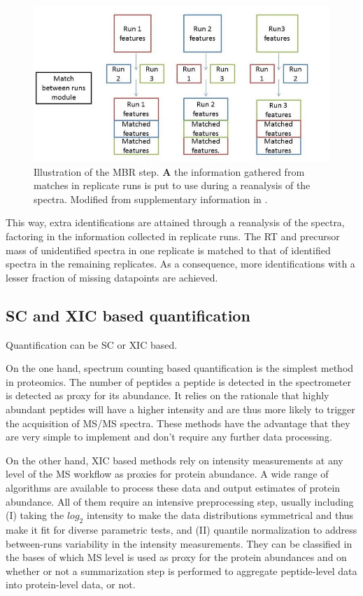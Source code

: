 \documentclass[11pt, a4paper]{report}
\begin{document}
\begin{figure}[!h]
\centering
\includegraphics[width=0.9\linewidth]{mbr_workflow}
\caption{Illustration of the \ac{MBR} step. \textbf{A} the information gathered from matches in replicate runs is put to use during a reanalysis of the spectra. Modified from supplementary information in \cite{Argentini2016}.}
\label{figure:moff_mbr}
\end{figure}

This way, extra identifications are attained through a reanalysis of the spectra, factoring in the information collected in replicate runs. The RT and precursor mass of unidentified spectra in one replicate is matched to that of identified spectra in the remaining replicates. As a consequence, more identifications with a lesser fraction of missing datapoints are achieved.


\subsection{SC and XIC based quantification}
\label{subsec:scvsxic}


Quantification can be \ac{SC} or \ac{XIC} based.

On the one hand, spectrum counting based quantification is the simplest method in proteomics. The number of peptides a peptide is detected in the spectrometer is detected as proxy for its abundance. It relies on the rationale that highly abundant peptides will have a higher intensity and are thus more likely to trigger the acquisition of MS/MS spectra. These methods have the advantage that they are very simple to implement and don't require any further data processing.

On the other hand, \ac{XIC} based methods rely on intensity measurements at any level of the \ac{MS} workflow as proxies for protein abundance. A wide range of algorithms are available to process these data and output estimates of protein abundance. All of them require an intensive preprocessing step, usually including (I) taking the $log_2$ intensity to make the data distributions symmetrical and thus make it fit for diverse parametric tests, and (II) quantile normalization to address between-runs variability in the intensity measurements. They can be classified in the bases of which MS level is used as proxy for the protein abundances and on whether or not a summarization step is performed to aggregate peptide-level data into protein-level data, or not. 
\end{document}
